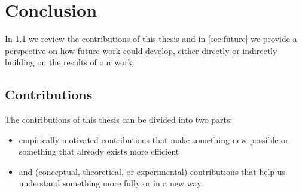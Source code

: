 \chapter{Conclusion}\label{chapter:conclusion}

In \cref{sec:contributions} we review the contributions of this thesis and in
\cref{sec:future} we provide a perspective on how future work could develop,
either directly or indirectly building on the results of our work.

\section{Contributions}\label{sec:contributions}


The contributions of this thesis can be divided into two parts:
\begin{itemize}
  \item empirically-motivated contributions that make something new possible or
        something that already exists more efficient
  \item and (conceptual, theoretical, or experimental) contributions that help
        us understand something more fully or in a new way.
\end{itemize}


